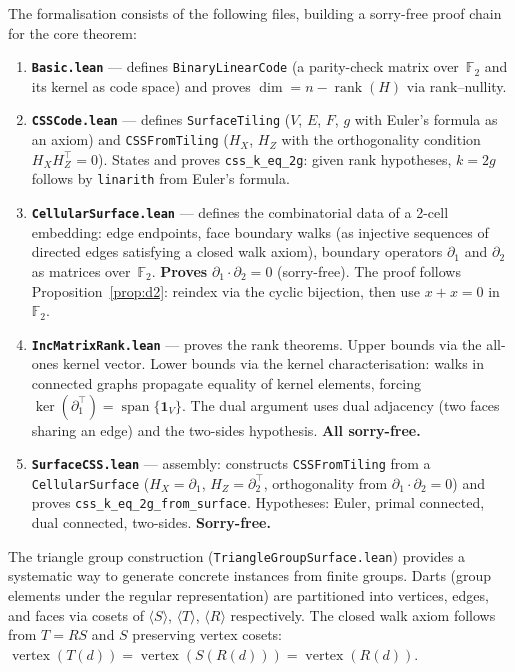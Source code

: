 \documentclass[11pt,a4paper]{article}
\newcommand{\FF}{\mathbb{F}_2}
\begin{document}
The formalisation consists of the following files, building a
sorry-free proof chain for the core theorem:

\begin{enumerate}[leftmargin=*]
\item \textbf{\texttt{Basic.lean}} --- defines \texttt{BinaryLinearCode}
  (a parity-check matrix over~$\FF$ and its kernel as code space) and
  proves $\dim = n - \operatorname{rank}(H)$ via rank--nullity.

\item \textbf{\texttt{CSSCode.lean}} --- defines \texttt{SurfaceTiling}
  ($V$, $E$, $F$, $g$ with Euler's formula as an axiom) and
  \texttt{CSSFromTiling} ($H_X$, $H_Z$ with the orthogonality condition
  $H_X H_Z^\top = 0$). States and proves \texttt{css\_k\_eq\_2g}: given rank
  hypotheses, $k = 2g$ follows by \texttt{linarith} from Euler's formula.

\item \textbf{\texttt{CellularSurface.lean}} --- defines the combinatorial
  data of a 2-cell embedding: edge endpoints, face boundary walks (as
  injective sequences of directed edges satisfying a closed walk axiom),
  boundary operators $\partial_1$ and $\partial_2$ as matrices over~$\FF$.
  \textbf{Proves} $\partial_1 \cdot \partial_2 = 0$ (sorry-free). The proof
  follows Proposition~\ref{prop:d2}: reindex via the cyclic bijection, then
  use $x + x = 0$ in~$\FF$.

\item \textbf{\texttt{IncMatrixRank.lean}} --- proves the rank theorems.
  Upper bounds via the all-ones kernel vector. Lower bounds via the kernel
  characterisation: walks in connected graphs propagate equality of kernel
  elements, forcing $\ker(\partial_1^\top) =
  \operatorname{span}\{\mathbf{1}_V\}$. The dual argument uses dual
  adjacency (two faces sharing an edge) and the two-sides hypothesis.
  \textbf{All sorry-free.}

\item \textbf{\texttt{SurfaceCSS.lean}} --- assembly: constructs
  \texttt{CSSFromTiling} from a \texttt{CellularSurface}
  ($H_X = \partial_1$, $H_Z = \partial_2^\top$, orthogonality from
  $\partial_1 \cdot \partial_2 = 0$) and proves
  \texttt{css\_k\_eq\_2g\_from\_surface}. Hypotheses: Euler,
  primal connected, dual connected, two-sides. \textbf{Sorry-free.}
\end{enumerate}

The triangle group construction (\texttt{TriangleGroupSurface.lean}) provides
a systematic way to generate concrete instances from finite groups. Darts
(group elements under the regular representation) are partitioned into
vertices, edges, and faces via cosets of $\langle S \rangle$,
$\langle T \rangle$, $\langle R \rangle$ respectively. The closed walk
axiom follows from $T = RS$ and $S$ preserving vertex cosets:
$\operatorname{vertex}(T(d)) = \operatorname{vertex}(S(R(d))) =
\operatorname{vertex}(R(d))$.
\end{document}
